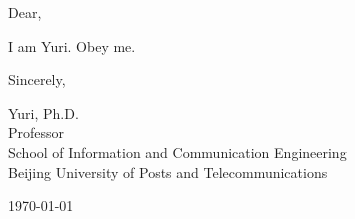 \documentclass[12pt]{article}
\begin{document}
	Dear,
	
	I am Yuri. Obey me.
	
	Sincerely,
	
	\bigskip	
	Yuri, Ph.D.\\
	Professor\\
	School of Information and Communication Engineering\\
	Beijing University of Posts and Telecommunications
	
	\bigskip
	\today
	
\end{document}
